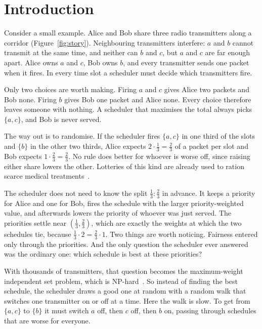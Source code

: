 \documentclass[11pt,a4paper]{article}
\begin{document}
\section{Introduction}

Consider a small example. Alice and Bob share three radio transmitters along a corridor
(Figure~\ref{fig:story}). Neighbouring transmitters interfere: $a$ and $b$ cannot transmit at the same
time, and neither can $b$ and $c$, but $a$ and $c$ are far enough apart. Alice owns $a$ and $c$, Bob owns
$b$, and every transmitter sends one packet when it fires. In every time slot a scheduler must decide
which transmitters fire.

Only two choices are worth making. Firing $a$ and $c$ gives Alice two packets and Bob none. Firing $b$
gives Bob one packet and Alice none. Every choice therefore leaves someone with nothing. A scheduler
that maximises the total always picks $\{a,c\}$, and Bob is never served.

The way out is to randomise. If the scheduler fires $\{a,c\}$ in one third of the slots and $\{b\}$ in
the other two thirds, Alice expects $2\cdot\frac13=\frac23$ of a packet per slot and Bob expects
$1\cdot\frac23=\frac23$. No rule does better for whoever is worse off, since raising either share lowers
the other. Lotteries of this kind are already used to ration scarce medical
treatments~\cite{white2022multicenter,pathak2024fair}.

The scheduler does not need to know the split $\frac13:\frac23$ in advance. It keeps a priority for
Alice and one for Bob, fires the schedule with the larger priority-weighted value, and afterwards
lowers the priority of whoever was just served. The priorities settle near $(\frac13,\frac23)$, which
are exactly the weights at which the two schedules tie, because $\frac13\cdot2=\frac23\cdot1$. Two things
are worth noticing. Fairness entered only through the priorities. And the only question the scheduler
ever answered was the ordinary one: which schedule is best at these priorities?

With thousands of transmitters, that question becomes the maximum-weight independent set problem,
which is NP-hard~\cite{garey1979computers}. So instead of finding the best schedule, the scheduler draws
a good one at random with a random walk that switches one transmitter on or off at a time. Here the walk
is slow. To get from $\{a,c\}$ to $\{b\}$ it must switch $a$ off, then $c$ off, then $b$ on, passing
through schedules that are worse for everyone.
\end{document}
